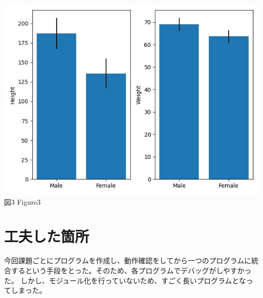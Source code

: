 \documentclass[a4paper]{ltjsarticle}
\begin{document}
\begin{center}
    \includegraphics{Figure_3.jpeg} \\
    図3 Figure3
\end{center}

\section*{工夫した箇所}
今回課題ごとにプログラムを作成し、動作確認をしてから一つのプログラムに統合するという手段をとった。そのため、各プログラムでデバッグがしやすかった。
しかし、モジュール化を行っていないため、すごく長いプログラムとなってしまった。
\end{document}
